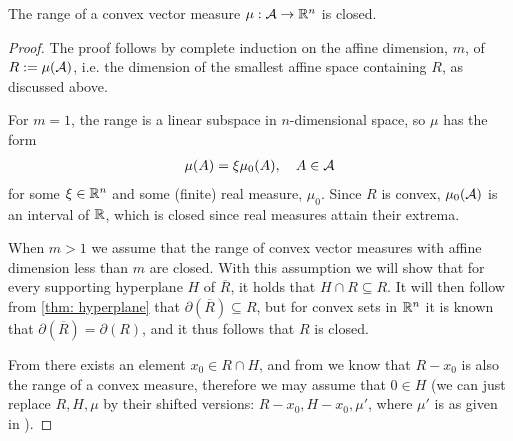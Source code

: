 \begin{lemma}\label{lem: convex means closed}
The range of a convex vector measure $\mu:\mathcal{A}\to \mathbb{R}^{n}$ is closed.
\end{lemma}
\begin{proof}
The proof follows by complete induction on the affine dimension, $m$, of $R:=\mu(\mathcal{A})$, i.e. the dimension of the smallest affine space containing $R$, as discussed above.

For $m=1$, the range is a linear subspace in $n$-dimensional space, so $\mu$ has the form
\begin{align*}
	\mu(A)=\xi \mu_{0}(A), \quad A\in \mathcal{A}
\end{align*}
for some $\xi\in \mathbb{R}^{n}$ and some (finite) real measure, $\mu_{0}$. Since $R$ is convex, $\mu_{0}(\mathcal{A})$ is an interval of $\mathbb{R}$, which is closed since real measures attain their extrema.

When $m>1$ we assume that the range of convex vector measures with affine dimension less than $m$ are closed.
With this assumption we will show that for every supporting hyperplane $H$ of $\overline{R}$, it holds that $H\cap R\subseteq R$. It will then follow from \cref{thm: hyperplane} that $\partial(\overline{R})\subseteq R$, but for convex sets in $\mathbb{R}^{n}$ it is known that $\partial(\overline{R})=\partial(R)$, and it thus follows that $R$ is closed.

From  there exists an element $x_{0}\in R\cap H$, and from  we know that $R-x_{0}$ is also the range of a convex measure, therefore we may assume that $0\in H$ (we can just replace $R,H,\mu$ by their shifted versions: $R-x_{0},H-x_{0},\mu'$, where $\mu'$ is as given in ).


\end{proof}
